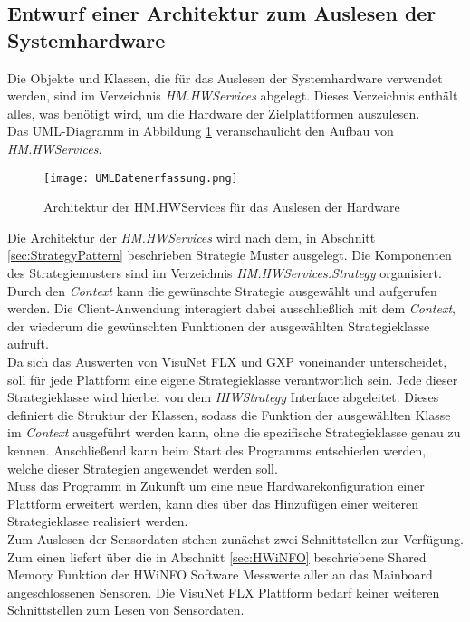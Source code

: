 \subsection{Entwurf einer Architektur zum Auslesen der Systemhardware}\label{sec:AuslesenHardware}
Die Objekte und Klassen, die für das Auslesen der Systemhardware verwendet werden, sind im Verzeichnis \textit{HM.HWServices} abgelegt. Dieses Verzeichnis enthält alles, was benötigt wird, um die Hardware der Zielplattformen auszulesen.\\
Das UML-Diagramm in Abbildung \ref{fig:HWServicesUML} veranschaulicht den Aufbau von \textit{HM.HWServices}. 
\begin{center}
    \begin{figure}[h!]
        \centering
        \texttt{[image: UMLDatenerfassung.png]}
        \caption{Architektur der HM.HWServices für das Auslesen der Hardware}
        \label{fig:HWServicesUML}
    \end{figure}
\end{center}
\vspace{-1.8cm}
Die Architektur der \textit{HM.HWServices} wird nach dem, in Abschnitt \ref{sec:StrategyPattern} beschrieben Strategie Muster ausgelegt.
Die Komponenten des Strategiemusters sind im Verzeichnis \textit{HM.HWServices.Strategy} organisiert.\\
Durch den \textit{Context} kann die gewünschte Strategie ausgewählt und aufgerufen werden. Die Client-Anwendung interagiert dabei ausschließlich mit dem \textit{Context}, der wiederum die gewünschten Funktionen der ausgewählten Strategieklasse aufruft.\\  
Da sich das Auswerten von VisuNet FLX und GXP voneinander unterscheidet, soll für jede Plattform eine eigene Strategieklasse verantwortlich sein. Jede dieser Strategieklasse wird hierbei von dem \textit{IHWStrategy} Interface abgeleitet. Dieses definiert die Struktur der Klassen, sodass die Funktion der ausgewählten Klasse im \textit{Context} ausgeführt werden kann, ohne die spezifische Strategieklasse genau zu kennen. Anschließend kann beim Start des Programms entschieden werden, welche dieser Strategien angewendet werden soll.\\
Muss das Programm in Zukunft um eine neue Hardwarekonfiguration einer Plattform erweitert werden, kann dies über das Hinzufügen einer weiteren Strategieklasse realisiert werden.\\
Zum Auslesen der Sensordaten stehen zunächst zwei Schnittstellen zur Verfügung. Zum einen liefert über die in Abschnitt \ref{sec:HWiNFO} beschriebene Shared Memory Funktion der HWiNFO Software Messwerte aller an das Mainboard angeschlossenen Sensoren. Die VisuNet FLX Plattform bedarf keiner weiteren Schnittstellen zum Lesen von Sensordaten.\\
